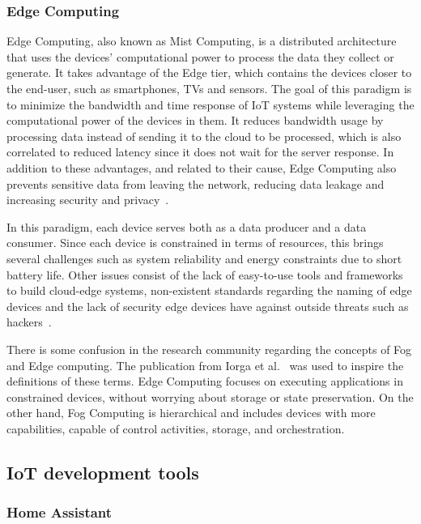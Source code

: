 \subsubsection{Edge Computing}\label{sec:edge_computing}

Edge Computing, also known as Mist Computing, is a distributed architecture that uses the devices' computational power to process the data they collect or generate. It takes advantage of the Edge tier, which contains the devices closer to the end-user, such as smartphones, TVs and sensors. The goal of this paradigm is to minimize the bandwidth and time response of IoT systems while leveraging the computational power of the devices in them. It reduces bandwidth usage by processing data instead of sending it to the cloud to be processed, which is also correlated to reduced latency since it does not wait for the server response. In addition to these advantages, and related to their cause, Edge Computing also prevents sensitive data from leaving the network, reducing data leakage and increasing security and privacy~\cite{edge_computing, edge_computing_2019}.

In this paradigm, each device serves both as a data producer and a data consumer. Since each device is constrained in terms of resources, this brings several challenges such as system reliability and energy constraints due to short battery life. Other issues consist of the lack of easy-to-use tools and frameworks to build cloud-edge systems, non-existent standards regarding the naming of edge devices and the lack of security edge devices have against outside threats such as hackers~\cite{promise_of_edge_computing}.

There is some confusion in the research community regarding the concepts of Fog and Edge computing. The publication from Iorga et al.~\cite{fog_edge_differences} was used to inspire the definitions of these terms. Edge Computing focuses on executing applications in constrained devices, without worrying about storage or state preservation. On the other hand, Fog Computing is hierarchical and includes devices with more capabilities, capable of control activities, storage, and orchestration.

\subsection{IoT development tools}\label{sec:iot_tools}

\subsubsection{Home Assistant}\label{sec:home_assistant}

